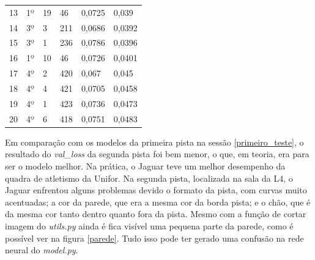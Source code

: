 \begin{table}[H]
\begin{tabular}{|l|l|l|l|l|l|}
13                   & 1º                   & 19             & 46                         & 0,0725                 & 0,039                       \\
14                   & 3º                   & 3              & 211                        & 0,0686                 & 0,0392                      \\
15                   & 3º                   & 1              & 236                        & 0,0786                 & 0,0396                      \\
16                   & 1º                   & 10             & 46                         & 0,0726                 & 0,0401                      \\
17                   & 4º                   & 2              & 420                        & 0,067                  & 0,045                       \\
18                   & 4º                   & 4              & 421                        & 0,0705                 & 0,0458                      \\
19                   & 4º                   & 1              & 423                        & 0,0736                 & 0,0473                      \\
20                   & 4º                   & 6              & 418                        & 0,0751                 & 0,0483 \\ \hline                    
\end{tabular}
\end{table}

Em comparação com os modelos da primeira pista na sessão \ref{primeiro_teste}, o resultado do \textit{val\_loss} da segunda pista foi bem menor, o que, em teoria, era para ser o modelo melhor. Na prática, o Jaguar teve um melhor desempenho da quadra de atletismo da Unifor. Na segunda pista, localizada na sala da L4, o Jaguar enfrentou alguns problemas devido o formato da pista, com curvas muito acentuadas; a cor da parede, que era a mesma cor da borda pista; e o chão, que é da mesma cor tanto dentro quanto fora da pista. Mesmo com a função de cortar imagem do \textit{utils.py} ainda é fica visível uma pequena parte da parede, como é possível ver na figura \ref{parede}. Tudo isso pode ter gerado uma confusão na rede neural do \textit{model.py}. 

	\begin{figure}[H]
		\centering
\end{figure}

